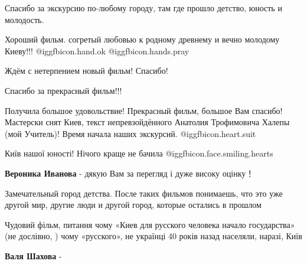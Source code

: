 \begin{itemize}
Спасибо за экскурсию по-любому городу, там где прошло детство, юность и молодость.

Хороший фильм. согретый любовью к родному древнему и вечно молодому Киеву!!! @igg{fbicon.hand.ok}  @igg{fbicon.hands.pray} 

Ждём с нетерпением новый фильм! Спасибо!

Спасибо за прекрасный фильм!!!


Получила большое удовольствие! Прекрасный фильм, большое Вам спасибо! Мастерски
снят Киев, текст непревзойдённого Анатолия Трофимовича Халепы (мой Учитель)!
Время начала наших экскурсий. @igg{fbicon.heart.suit}

Київ нашої юності! Нічого краще не бачила  @igg{fbicon.face.smiling.hearts} 

\textbf{Вероника Иванова} - дякую Вам за перегляд і дуже високу оцінку！


Замечательный город детства. После таких фильмов понимаешь, что это уже другой
мир, другие люди и другой город, которые остались в прошлом


Чудовий фільм, питання чому «Киев для русского человека начало государства» (не
дослівно, ) чому «русского», не українці 40 років назад населяли, наразі, Київ

\begin{itemize} %
\textbf{Валя Шахова} - 


\end{itemize}
\end{itemize}
